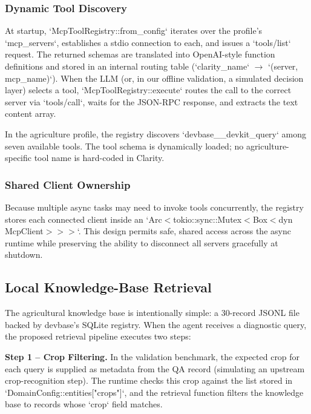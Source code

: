 \subsubsection{Dynamic Tool Discovery}

At startup, `McpToolRegistry::from\_config` iterates over the profile's `mcp\_servers`, establishes a stdio connection to each, and issues a `tools/list` request. The returned schemas are translated into OpenAI-style function definitions and stored in an internal routing table (`clarity\_name` $\rightarrow$ `(server, mcp\_name)`). When the LLM (or, in our offline validation, a simulated decision layer) selects a tool, `McpToolRegistry::execute` routes the call to the correct server via `tools/call`, waits for the JSON-RPC response, and extracts the text content array.

In the agriculture profile, the registry discovers `devbase__devkit\_query` among seven available tools. The tool schema is dynamically loaded; no agriculture-specific tool name is hard-coded in Clarity.

\subsubsection{Shared Client Ownership}

Because multiple async tasks may need to invoke tools concurrently, the registry stores each connected client inside an `Arc$<$tokio::sync::Mutex$<$Box$<$dyn McpClient$>$$>$$>$`. This design permits safe, shared access across the async runtime while preserving the ability to disconnect all servers gracefully at shutdown.

\subsection{Local Knowledge-Base Retrieval}

The agricultural knowledge base is intentionally simple: a 30-record JSONL file backed by devbase's SQLite registry. When the agent receives a diagnostic query, the proposed retrieval pipeline executes two steps:

\textbf{Step 1 -- Crop Filtering.} In the validation benchmark, the expected crop for each query is supplied as metadata from the QA record (simulating an upstream crop-recognition step). The runtime checks this crop against the list stored in `DomainConfig::entities["crops"]`, and the retrieval function filters the knowledge base to records whose `crop` field matches.

